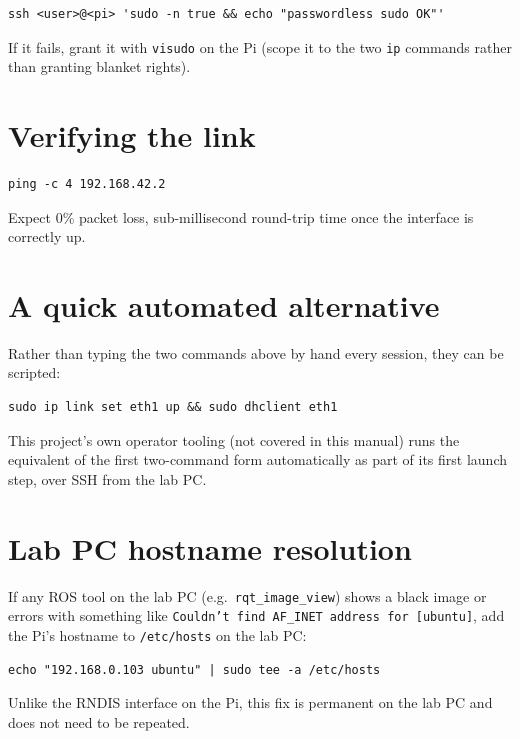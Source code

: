 \documentclass[11pt]{report}
\begin{document}
\begin{lstlisting}[style=shell]
ssh <user>@<pi> 'sudo -n true && echo "passwordless sudo OK"'
\end{lstlisting}

If it fails, grant it with \texttt{visudo} on the Pi (scope it to the two
\texttt{ip} commands rather than granting blanket rights).

\section{Verifying the link}

\begin{lstlisting}[style=shell]
ping -c 4 192.168.42.2
\end{lstlisting}

Expect 0\% packet loss, sub-millisecond round-trip time once the interface
is correctly up.

\section{A quick automated alternative}

Rather than typing the two commands above by hand every session, they can be
scripted:

\begin{lstlisting}[style=shell]
sudo ip link set eth1 up && sudo dhclient eth1
\end{lstlisting}

This project's own operator tooling (not covered in this manual) runs the
equivalent of the first two-command form automatically as part of its first
launch step, over SSH from the lab PC.

\section{Lab PC hostname resolution}

If any ROS tool on the lab PC (e.g.\ \texttt{rqt\_image\_view}) shows a
black image or errors with something like
\texttt{Couldn't find AF\_INET address for [ubuntu]}, add the Pi's hostname
to \texttt{/etc/hosts} on the lab PC:

\begin{lstlisting}[style=shell]
echo "192.168.0.103 ubuntu" | sudo tee -a /etc/hosts
\end{lstlisting}

Unlike the RNDIS interface on the Pi, this fix is permanent on the lab PC
and does not need to be repeated.
\end{document}
